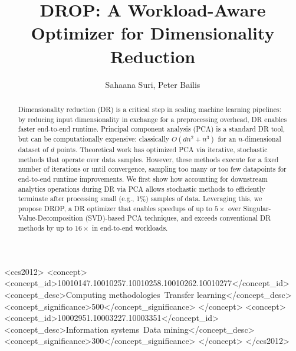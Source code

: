 \documentclass[sigconf,10pt]{acmart}
\newcommand{\red}[1]{{\color{black}#1}}
\theoremstyle{problem}
\begin{document}
\title{DROP: A Workload-Aware Optimizer for Dimensionality Reduction}


\author{Sahaana Suri, Peter Bailis}

\renewcommand{\shortauthors}{S. Suri and P. Bailis}



\begin{abstract}
Dimensionality reduction (DR) is a critical step in scaling machine learning pipelines: by reducing input dimensionality in exchange for a preprocessing overhead, DR enables faster end-to-end runtime. Principal component analysis (PCA) is a standard DR tool, but can be computationally expensive: classically $O(dn^2 + n^3)$ for an $n$-dimensional dataset of $d$ points. 
Theoretical work has optimized PCA via iterative, stochastic methods that operate over data samples. 
However, these methods execute for a fixed number of iterations or until convergence, sampling too many or too few datapoints for end-to-end runtime improvements. 
We first show how accounting for downstream analytics operations during DR via PCA allows stochastic methods to efficiently terminate after processing small (e.g., 1\%) samples of data. 
Leveraging this, we propose DROP, a DR optimizer that enables speedups of up to \red{$5\times$} over \red{Singular-Value-Decomposition (SVD)-based} PCA techniques, and exceeds conventional DR methods by up to \red{$16\times$} in end-to-end workloads.
\end{abstract}


\begin{CCSXML}
<ccs2012>
<concept>
<concept_id>10010147.10010257.10010258.10010262.10010277</concept_id>
<concept_desc>Computing methodologies~Transfer learning</concept_desc>
<concept_significance>500</concept_significance>
</concept>
<concept>
<concept_id>10002951.10003227.10003351</concept_id>
<concept_desc>Information systems~Data mining</concept_desc>
<concept_significance>300</concept_significance>
</concept>
</ccs2012>
\end{CCSXML}

\maketitle

%



%



%



%
\end{document}
